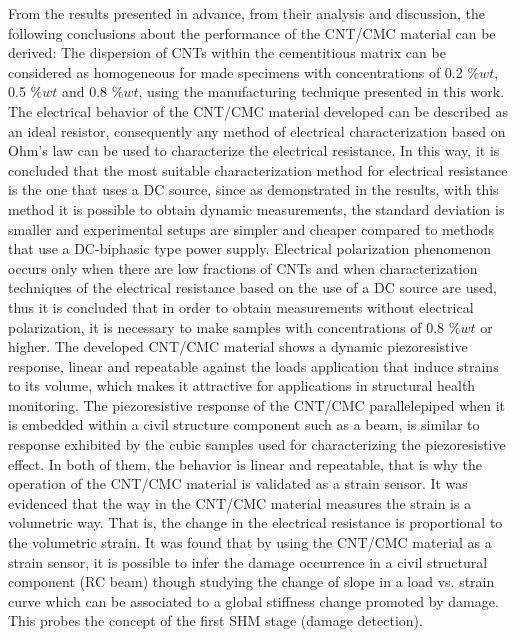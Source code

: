 \documentclass[twocolumn]{bmcart}%
\begin{document}
From the results presented in advance, from their analysis and discussion, the following conclusions about the performance of the CNT/CMC material can be derived:
The dispersion of CNTs within the cementitious matrix can be considered as homogeneous for made specimens with concentrations of 0.2 $\%wt$, 0.5 $\%wt$ and 0.8 $\%wt$, using the manufacturing technique presented in this work.
The electrical behavior of the CNT/CMC material developed can be described as an ideal resistor, consequently any method of electrical characterization based on Ohm's law can be used to characterize the electrical resistance. In this way, it is concluded that the most suitable characterization method for electrical resistance is the one that uses a DC source, since as demonstrated in the results, with this method it is possible to obtain dynamic measurements, the standard deviation is smaller and experimental setups are simpler and cheaper compared to methods that use a DC-biphasic type power supply.
Electrical polarization phenomenon occurs only when there are low fractions of CNTs and when characterization techniques of the electrical resistance based on the use of a DC source are used, thus it is concluded that in order to obtain measurements without electrical polarization, it is necessary to make samples with concentrations of 0.8 $\%wt$ or higher.
The developed CNT/CMC material shows a dynamic piezoresistive response, linear and repeatable against the loads application that induce strains to its volume, which makes it attractive for applications in structural health monitoring.
The piezoresistive response of the CNT/CMC parallelepiped when it is embedded within a civil structure component such as a beam, is similar to response exhibited by the cubic samples used for characterizing the piezoresistive effect.  In both of them, the behavior is linear and repeatable, that is why the operation of the CNT/CMC material is validated as a strain sensor.
It was evidenced that the way in the CNT/CMC material measures the strain is a volumetric way. That is, the change in the electrical resistance is proportional to the volumetric strain.
It was found that by using the CNT/CMC material as a strain sensor, it is possible to infer the damage occurrence in a civil structural component (RC beam) though studying the change of slope in a load vs. strain curve which can be associated to a global stiffness change promoted by damage. This probes the concept of the first SHM stage (damage detection).


\end{document}
